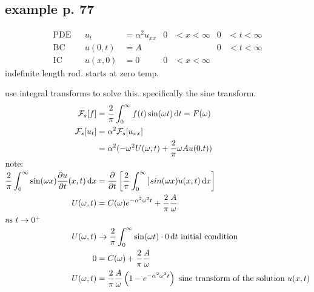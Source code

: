 \documentclass{article}
\begin{document}
\subsection*{example p. 77}
\begin{align*}
  \text{PDE}&&u_t&=\alpha^2u_{xx}&0&<x<\infty &0&<t<\infty\\
  \text{BC}&&u(0,t)&=A&&&0&<t<\infty\\
  \text{IC}&&u(x,0)&=0&0&<x<\infty
\end{align*}
indefinite length rod. starts at zero temp.

use integral transforms to solve this. specifically the sine transform.
\begin{align*}
  \mathcal{F}_s[f]&=\frac{2}{\pi}\int_0^\infty{f(t)\sin(\omega t)\,\mathrm{d}t}=F(\omega)\\
  \mathcal{F}_s[u_t]&=\alpha^2\mathcal{F}_s[u_{xx}]\\
  &=\alpha^2(-\omega^2U(\omega,t)+\frac{2}{\pi}\omega Au(0.t))\\
  \intertext{note:}
  \frac{2}{\pi}\int_0^\infty{\sin(\omega x)\frac{\partial u}{\partial t}(x,t)\,\mathrm{d}x}&=\frac{\partial}{\partial t}\left[\frac{2}{\pi}\int_0^\infty{]sin(\omega x)u(x,t)\,\mathrm{d}x}\right]\\
  U(\omega,t)&=C(\omega)e^{-\alpha^2\omega^2t}+\frac{2}{\pi}\frac{A}{\omega}\\
  \intertext{as $t\to0^+$}
  U(\omega,t)&\to\frac{2}{\pi}\int_0^\infty{\sin(\omega t)\cdot0\,\mathrm{d}t}\text{ initial condition}\\
  0&=C(\omega)+\frac{2}{\pi}\frac{A}{\omega}\\
  U(\omega,t)&=\frac{2}{\pi}\frac{A}{\omega}\left(1-e^{-\alpha^2\omega^2t}\right)\text{ sine transform of the solution $u(x,t)$}
\end{align*}
\end{document}
